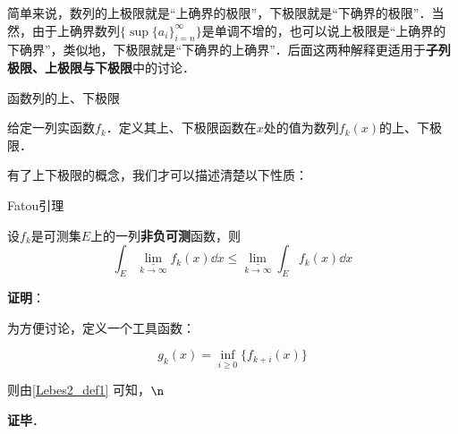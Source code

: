 简单来说，数列的上极限就是“上确界的极限”，下极限就是“下确界的极限”．当然，由于上确界数列$\{\sup \{a_i\}_{i=n}^\infty\}$是单调不增的，也可以说上极限是“上确界的下确界”，类似地，下极限就是“下确界的上确界”．后面这两种解释更适用于\textbf{子列极限、上极限与下极限}中的讨论．


\begin{definition}{函数列的上、下极限}\label{Lebes2_def1}

给定一列实函数$f_k$．定义其上、下极限函数在$x$处的值为数列$f_k(x)$的上、下极限．

\end{definition}

有了上下极限的概念，我们才可以描述清楚以下性质：

\begin{theorem}{Fatou引理}

设$f_k$是可测集$E$上的一列\textbf{非负可测}函数，则
\begin{equation}
\int_E \underline{\lim}\limits_{k\to \infty} f_k(x) \dd x \leq \underline{\lim}\limits_{k\to \infty}\int_E f_k(x) \dd x
\end{equation}

\end{theorem}

\textbf{证明}：

为方便讨论，定义一个工具函数：

\begin{equation}
g_k(x) = \inf\limits_{i\geq 0}\{f_{k+i}(x)\}
\end{equation}

则由\autoref{Lebes2_def1} 可知，$\n$

\textbf{证毕}．










